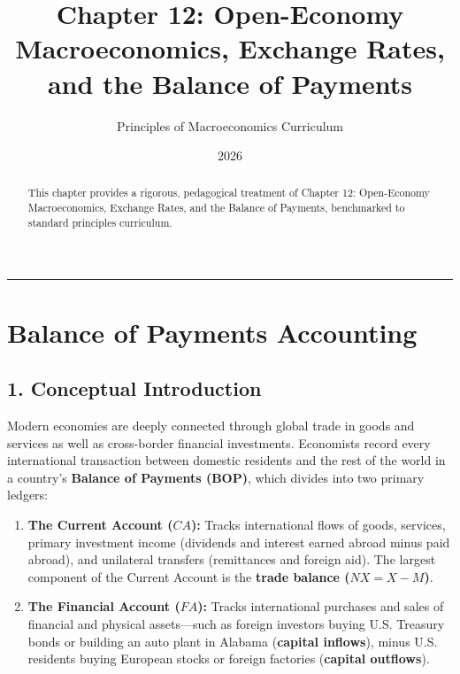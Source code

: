 \documentclass[11pt,letterpaper]{article}
\begin{document}
\title{\Huge\bfseries\color{SlateBlue} Chapter 12: Open-Economy Macroeconomics, Exchange Rates, and the Balance of Payments}
\author{\large Principles of Macroeconomics Curriculum}
\date{2026}
\maketitle

\thispagestyle{plain}

\begin{abstract}
This chapter provides a rigorous, pedagogical treatment of Chapter 12: Open-Economy Macroeconomics, Exchange Rates, and the Balance of Payments, benchmarked to standard principles curriculum.
\end{abstract}

\tableofcontents
\vspace{1.5em}
\hrule
\vspace{1.5em}

\section{Balance of Payments Accounting}

\subsection*{1. Conceptual Introduction}
Modern economies are deeply connected through global trade in goods and services as well as cross-border financial investments. Economists record every international transaction between domestic residents and the rest of the world in a country's \textbf{Balance of Payments (BOP)}, which divides into two primary ledgers:
\begin{enumerate}
    \item \textbf{The Current Account ($CA$):} Tracks international flows of goods, services, primary investment income (dividends and interest earned abroad minus paid abroad), and unilateral transfers (remittances and foreign aid). The largest component of the Current Account is the \textbf{trade balance ($NX = X - M$)}.
    \item \textbf{The Financial Account ($FA$):} Tracks international purchases and sales of financial and physical assets—such as foreign investors buying U.S. Treasury bonds or building an auto plant in Alabama (\textbf{capital inflows}), minus U.S. residents buying European stocks or foreign factories (\textbf{capital outflows}).
\end{enumerate}
\end{document}
